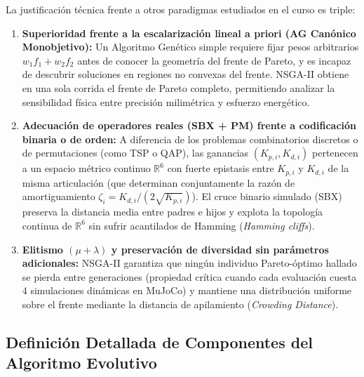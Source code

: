 \documentclass[11pt,a4paper]{article}
\begin{document}
La justificación técnica frente a otros paradigmas estudiados en el curso es triple:
\begin{enumerate}
    \item \textbf{Superioridad frente a la escalarización lineal a priori (AG Canónico Monobjetivo):} Un Algoritmo Genético simple requiere fijar pesos arbitrarios $w_1 f_1 + w_2 f_2$ antes de conocer la geometría del frente de Pareto, y es incapaz de descubrir soluciones en regiones no convexas del frente. NSGA-II obtiene en una sola corrida el frente de Pareto completo, permitiendo analizar la sensibilidad física entre precisión milimétrica y esfuerzo energético.
    \item \textbf{Adecuación de operadores reales (SBX + PM) frente a codificación binaria o de orden:} A diferencia de los problemas combinatorios discretos o de permutaciones (como TSP o QAP), las ganancias $(K_{p,i}, K_{d,i})$ pertenecen a un espacio métrico continuo $\mathbb{R}^6$ con fuerte epistasis entre $K_{p,i}$ y $K_{d,i}$ de la misma articulación (que determinan conjuntamente la razón de amortiguamiento $\zeta_i = K_{d,i} / (2\sqrt{K_{p,i}})$). El cruce binario simulado (SBX) preserva la distancia media entre padres e hijos y explota la topología continua de $\mathbb{R}^6$ sin sufrir acantilados de Hamming (\textit{Hamming cliffs}).
    \item \textbf{Elitismo $(\mu+\lambda)$ y preservación de diversidad sin parámetros adicionales:} NSGA-II garantiza que ningún individuo Pareto-óptimo hallado se pierda entre generaciones (propiedad crítica cuando cada evaluación cuesta 4 simulaciones dinámicas en MuJoCo) y mantiene una distribución uniforme sobre el frente mediante la distancia de apilamiento (\textit{Crowding Distance}).
\end{enumerate}

\subsection{Definición Detallada de Componentes del Algoritmo Evolutivo}
\end{document}
